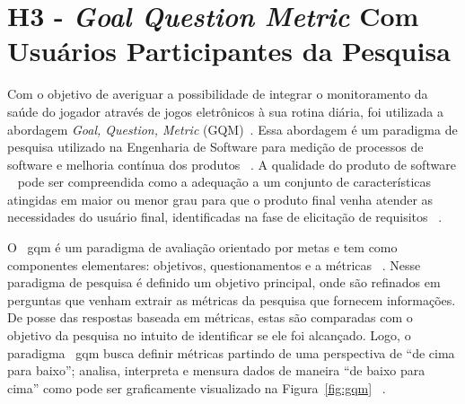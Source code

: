 \section{H3 - \textit{Goal Question Metric} Com Usuários Participantes da Pesquisa}\label{gqm_usuarios}

Com o objetivo de averiguar a possibilidade de integrar o monitoramento da saúde do jogador através de jogos eletrônicos à sua rotina diária, foi utilizada a abordagem \textit{Goal, Question, Metric} (GQM)~\cite{van1999goal}. Essa abordagem é um paradigma de pesquisa utilizado na Engenharia de Software para medição de processos de software e melhoria contínua dos produtos ~\cite{saraiva2006,elicquest05}. A qualidade do produto de software ~\cite{saraiva2006} pode ser compreendida como a adequação a um conjunto de características atingidas em maior ou menor grau para que o produto final venha atender as necessidades do usuário final, identificadas na fase de elicitação de requisitos ~\cite{elicquest05}.

O ~\ac{gqm} é um paradigma de avaliação orientado por metas e tem como componentes elementares: objetivos, questionamentos e a métricas ~\cite{saraiva2006}. Nesse paradigma de pesquisa é definido um objetivo principal, onde são refinados em perguntas que venham extrair as métricas da pesquisa que fornecem informações. De posse das respostas baseada em métricas, estas são comparadas com o objetivo da pesquisa no intuito de identificar se ele foi alcançado. Logo, o paradigma ~\ac{gqm} busca definir métricas partindo de uma perspectiva de ``de cima para baixo''; analisa, interpreta e mensura dados de maneira ``de baixo para cima'' como pode ser graficamente visualizado na Figura~\ref{fig:gqm} ~\cite{van1999goal}. 

